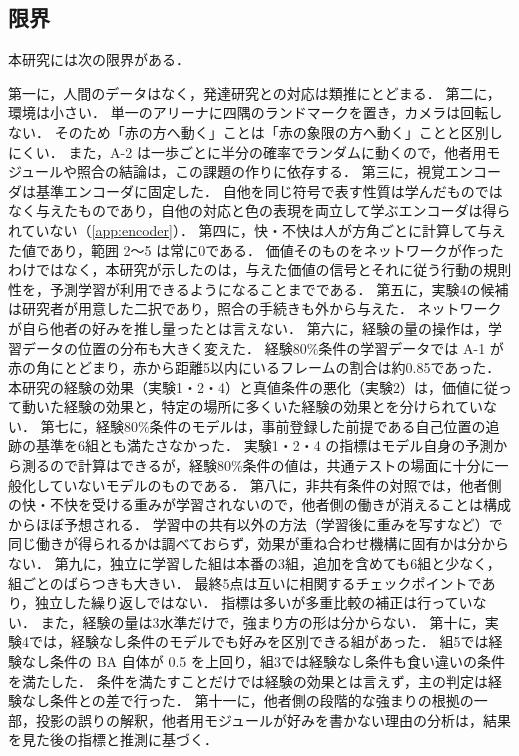 \subsection{限界}\label{sec:limitations}
本研究には次の限界がある．

第一に，人間のデータはなく，発達研究との対応は類推にとどまる．
第二に，環境は小さい．
単一のアリーナに四隅のランドマークを置き，カメラは回転しない．
そのため「赤の方へ動く」ことは「赤の象限の方へ動く」ことと区別しにくい．
また，A-2 は一歩ごとに半分の確率でランダムに動くので，他者用モジュールや照合の結論は，この課題の作りに依存する．
第三に，視覚エンコーダは基準エンコーダに固定した．
自他を同じ符号で表す性質は学んだものではなく与えたものであり，自他の対応と色の表現を両立して学ぶエンコーダは得られていない（\ref{app:encoder}）．
第四に，快・不快は人が方角ごとに計算して与えた値であり，範囲 2〜5 は常に0である．
価値そのものをネットワークが作ったわけではなく，本研究が示したのは，与えた価値の信号とそれに従う行動の規則性を，予測学習が利用できるようになることまでである．
第五に，実験4の候補は研究者が用意した二択であり，照合の手続きも外から与えた．
ネットワークが自ら他者の好みを推し量ったとは言えない．
第六に，経験の量の操作は，学習データの位置の分布も大きく変えた．
経験80\%条件の学習データでは A-1 が赤の角にとどまり，赤から距離5以内にいるフレームの割合は約0.85であった．
本研究の経験の効果（実験1・2・4）と真値条件の悪化（実験2）は，価値に従って動いた経験の効果と，特定の場所に多くいた経験の効果とを分けられていない．
第七に，経験80\%条件のモデルは，事前登録した前提である自己位置の追跡の基準を6組とも満たさなかった．
実験1・2・4 の指標はモデル自身の予測から測るので計算はできるが，経験80\%条件の値は，共通テストの場面に十分に一般化していないモデルのものである．
第八に，非共有条件の対照では，他者側の快・不快を受ける重みが学習されないので，他者側の働きが消えることは構成からほぼ予想される．
学習中の共有以外の方法（学習後に重みを写すなど）で同じ働きが得られるかは調べておらず，効果が重ね合わせ機構に固有かは分からない．
第九に，独立に学習した組は本番の3組，追加を含めても6組と少なく，組ごとのばらつきも大きい．
最終5点は互いに相関するチェックポイントであり，独立した繰り返しではない．
指標は多いが多重比較の補正は行っていない．
また，経験の量は3水準だけで，強まり方の形は分からない．
第十に，実験4では，経験なし条件のモデルでも好みを区別できる組があった．
組5では経験なし条件の BA 自体が 0.5 を上回り，組3では経験なし条件も食い違いの条件を満たした．
条件を満たすことだけでは経験の効果とは言えず，主の判定は経験なし条件との差で行った．
第十一に，他者側の段階的な強まりの根拠の一部，投影の誤りの解釈，他者用モジュールが好みを書かない理由の分析は，結果を見た後の指標と推測に基づく．

